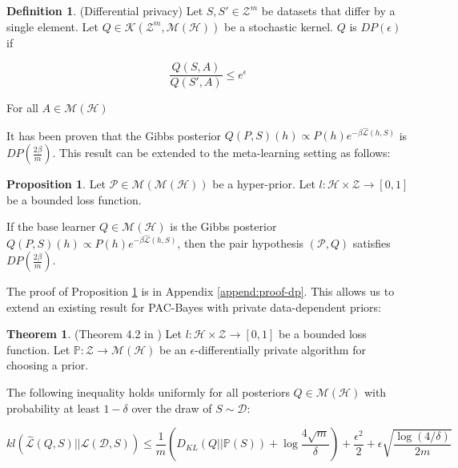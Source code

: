 \documentclass{article}
\theoremstyle{definition}
\newtheorem{defn}{Definition}[section]
\newtheorem{theorem}{Theorem}[section]
\newtheorem{proposition}{Proposition}[section]
\begin{document}
\begin{defn} (Differential privacy)
	Let $S,S'\in \mathcal{Z}^m$ be datasets that differ by a single element.
	Let $Q\in \mathcal{K}(\mathcal{Z}^m, \mathcal{M}(\mathcal{H}))$ be a stochastic kernel.
	$Q$ is $DP(\epsilon)$ if 
	
	$$\frac{Q(S, A)}{Q(S', A)} \leq e^\epsilon$$
	
	For all $A\in  \mathcal{M}(\mathcal{H})$
\end{defn}

It has been proven \citep{McSherry2007, Rivasplata2020} that the Gibbs posterior $Q(P, S)(h)\propto P(h)e^{-\beta\hat{\mathcal{L}}(h, S)}$ is $DP\left (\frac{2\beta}{m}\right )$.
This result can be extended to the meta-learning setting as follows:

\begin{proposition} \label{thm:pair-is-dp}
	Let $\mathcal{P}\in \mathcal{M}(\mathcal{M}(\mathcal{H}))$ be a hyper-prior.
	Let $l:\mathcal{H}\times \mathcal{Z}\rightarrow [0,1]$ be a bounded loss function.
	
	If the base learner $Q\in \mathcal{M}(\mathcal{H})$ is the Gibbs posterior $Q(P, S)(h)\propto P(h)e^{-\beta\hat{\mathcal{L}}(h, S)}$, 
	then the pair hypothesis $(\mathcal{P}, Q)$ satisfies $DP\left (\frac{2\beta}{m}\right )$.
\end{proposition}

The proof of Proposition \ref{thm:pair-is-dp} is in Appendix \ref{append:proof-dp}. This  allows us to extend an existing result for PAC-Bayes with private data-dependent priors:

\begin{theorem} (Theorem 4.2 in \citet{Dziugaite2018})
	Let $l:\mathcal{H}\times \mathcal{Z}\rightarrow [0,1]$ be a bounded loss function.
	Let $\mathbb{P}:\mathcal{Z}\rightarrow \mathcal{M}(\mathcal{H})$ be an $\epsilon$-differentially private algorithm for choosing a prior.
	
	The following inequality holds uniformly for all posteriors $Q\in \mathcal{M}(\mathcal{H})$ with probability at least $1-\delta$ over the draw of $S\sim \mathcal{D}$:
	
	$$kl(\hat{\mathcal{L}}(Q,S)||\mathcal{L}(\mathcal{D},S))\leq \frac{1}{m}\left (D_{KL}(Q||\mathbb{P}(S))+\log\frac{4\sqrt{m}}{\delta} \right ) +\frac{\epsilon^2}{2}+\epsilon\sqrt{\frac{\log (4/\delta)}{2m}} $$

\end{theorem}
\end{document}
